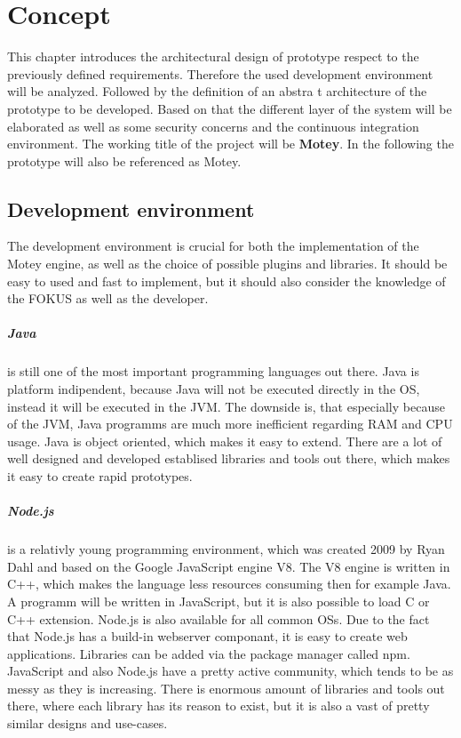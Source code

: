\chapter{Concept}\label{chapter:concept}
This chapter introduces the architectural design of prototype respect to the previously defined requirements.
Therefore the used development environment will be analyzed.
Followed by the definition of an abstra t architecture of the prototype to be developed.
Based on that the different layer of the system will be elaborated as well as some security concerns and the continuous integration environment.
The working title of the project will be \textbf{Motey}.
In the following the prototype will also be referenced as Motey.


\section{Development environment}
The development environment is crucial for both the implementation of the Motey engine, as well as the choice of possible plugins and libraries.
It should be easy to used and fast to implement, but it should also consider the knowledge of the \ac{FOKUS} as well as the developer.

\paragraph{Java} is still one of the most important programming languages out there.\autocite[cf.]{ProgramminLanguage:2017}
Java is platform indipendent, because Java will not be executed directly in the \ac{OS}, instead it will be executed in the \ac{JVM}.
The downside is, that especially because of the \ac{JVM}, Java programms are much more inefficient regarding \ac{RAM} and \ac{CPU} usage.
Java is object oriented, which makes it easy to extend.
There are a lot of well designed and developed establised libraries and tools out there, which makes it easy to create rapid prototypes.

\paragraph{Node.js} is a relativly young programming environment, which was created 2009 by Ryan Dahl and based on the Google JavaScript engine V8.
The V8 engine is written in C++, which makes the language less resources consuming then for example Java.
A programm will be written in JavaScript, but it is also possible to load C or C++ extension.
Node.js is also available for all common \acp{OS}.
Due to the fact that Node.js has a build-in webserver componant, it is easy to create web applications.
Libraries can be added via the package manager called npm.
JavaScript and also Node.js have a pretty active community, which tends to be as messy as they is increasing.
There is enormous amount of libraries and tools out there, where each library has its reason to exist, but it is also a vast of pretty similar designs and use-cases.

